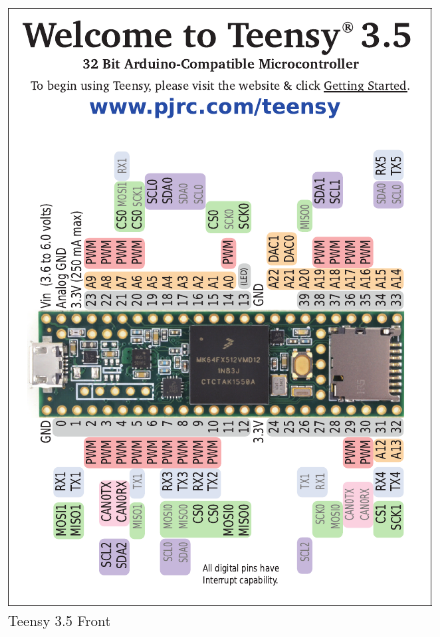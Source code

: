 \documentclass{article}
\begin{document}
\begin{figure}[H]
    \centering
    \includegraphics[width=\textwidth]{images/card8a_rev2.pdf}
    \caption{Teensy 3.5 Front}
    \label{fig:teensy_front}
\end{figure}
\end{document}
